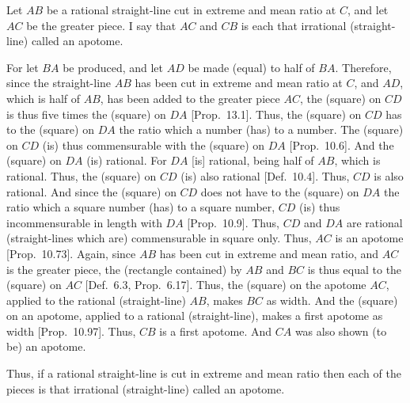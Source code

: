 \begin{Parallel}{}{}
{Let  $AB$ be a rational straight-line cut in extreme and mean ratio
at $C$, and let $AC$ be the greater piece. I say that  $AC$ and
$CB$ is each that irrational (straight-line) called an apotome.

For let $BA$ be produced, and let $AD$ be made (equal) to
half of $BA$. Therefore, since the straight-line $AB$ has been cut in
extreme and mean ratio at $C$, and $AD$, which is half of $AB$, has been added to the greater piece $AC$, the (square) on $CD$ is thus 
five times the (square) on $DA$ [Prop.~13.1]. Thus, the (square) on $CD$
has to the (square) on $DA$ the ratio which a number (has) to a number.
The (square) on $CD$ (is) thus commensurable with the (square) on
$DA$ [Prop.~10.6]. And the (square) on $DA$ (is) rational.
For $DA$ [is] rational, being half of $AB$, which is rational.
Thus, the (square) on $CD$ (is) also rational [Def.~10.4]. 
Thus, $CD$ is also rational. And since the (square) on $CD$ does not have to
the (square) on $DA$ the ratio which a square number (has) to a square
number, $CD$ (is) thus incommensurable in length with $DA$ [Prop.~10.9].
Thus, $CD$  and $DA$ are rational (straight-lines which are) commensurable in square only. Thus, $AC$ is an apotome [Prop.~10.73].  Again, since
$AB$ has been cut in extreme and mean ratio, and $AC$ is the greater
piece, the (rectangle contained) by $AB$ and $BC$ is thus equal
to the (square) on $AC$ [Def.~6.3, Prop.~6.17]. Thus, the (square) on
the apotome $AC$, applied to the rational (straight-line) $AB$, makes $BC$
as width. And the (square) on an apotome, applied to a rational
(straight-line), makes a first apotome as width [Prop.~10.97].
Thus, $CB$ is a first apotome. And $CA$ was also
shown (to be) an apotome.

Thus, if a rational straight-line is cut in extreme and mean ratio then each of
the pieces is that irrational (straight-line) called an apotome.}
\end{Parallel}


